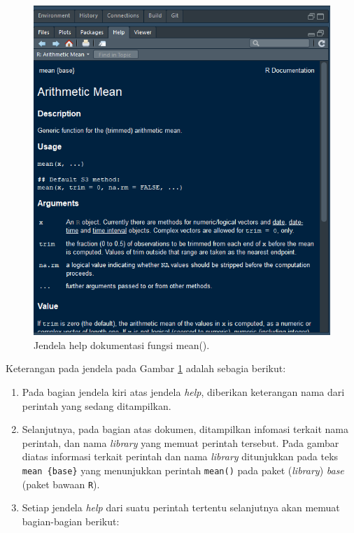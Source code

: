 \documentclass[]{book}
\providecommand{\tightlist}{%
  \setlength{\itemsep}{0pt}\setlength{\parskip}{0pt}}
\theoremstyle{definition}
\theoremstyle{definition}
\theoremstyle{definition}
\theoremstyle{remark}
\begin{document}
\begin{figure}

{\centering \includegraphics[width=0.5\linewidth]{./images/meandoc} 

}

\caption{Jendela help dokumentasi fungsi mean().}\label{fig:meandoc}
\end{figure}

Keterangan pada jendela pada Gambar \ref{fig:meandoc} adalah sebagia berikut:

\begin{enumerate}
\def\labelenumi{\arabic{enumi}.}
\tightlist
\item
  Pada bagian jendela kiri atas jendela \emph{help}, diberikan keterangan nama dari perintah yang sedang ditampilkan.
\item
  Selanjutnya, pada bagian atas dokumen, ditampilkan infomasi terkait nama perintah, dan nama \emph{library} yang memuat perintah tersebut. Pada gambar diatas informasi terkait perintah dan nama \emph{library} ditunjukkan pada teks \texttt{mean\ \{base\}} yang menunjukkan perintah \texttt{mean()} pada paket (\emph{library}) \emph{base} (paket bawaan \texttt{R}).
\item
  Setiap jendela \emph{help} dari suatu perintah tertentu selanjutnya akan memuat bagian-bagian berikut:
\end{enumerate}
\end{document}
